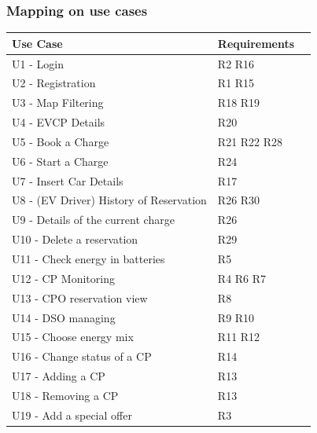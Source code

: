 \subsubsection{Mapping on use cases}
\begin{table}[H]
    \begin{tabularx}{\textwidth}{XXX}
        \toprule
        \textbf{Use Case}                       & \textbf{Requirements} \\ \midrule
        U1 - Login                              & R2 R16                \\
        U2 - Registration                       & R1 R15                \\
        U3 - Map Filtering                      & R18 R19               \\
        U4 - EVCP Details                       & R20                   \\
        U5 - Book a Charge                      & R21 R22 R28           \\
        U6 - Start a Charge                     & R24                   \\
        U7 - Insert Car Details                 & R17                   \\
        U8 - (EV Driver) History of Reservation & R26 R30               \\
        U9 - Details of the current charge      & R26                   \\
        U10 - Delete a reservation              & R29                   \\
        U11 - Check energy in batteries         & R5                    \\
        U12 - CP Monitoring                     & R4 R6 R7              \\
        U13 - CPO reservation view              & R8                    \\
        U14 - DSO managing                      & R9 R10                \\
        U15 - Choose energy mix                 & R11 R12               \\
        U16 - Change status of a CP             & R14                   \\
        U17 - Adding a CP                       & R13                   \\
        U18 - Removing a CP                     & R13                   \\
        U19 - Add a special offer               & R3                    \\ \bottomrule
    \end{tabularx}
\end{table}

